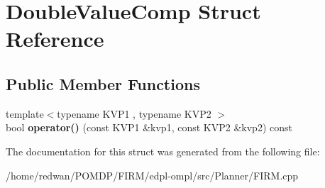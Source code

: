 \hypertarget{struct_double_value_comp}{}\section{Double\+Value\+Comp Struct Reference}
\label{struct_double_value_comp}
\subsection*{Public Member Functions}
\begin{DoxyCompactItemize}
\item 
\mbox{\label{struct_double_value_comp_ad006bf78092cd573750c57d7e6ece43f}} 
{\footnotesize template$<$typename K\+V\+P1 , typename K\+V\+P2 $>$ }\\bool {\bfseries operator()} (const K\+V\+P1 \&kvp1, const K\+V\+P2 \&kvp2) const
\end{DoxyCompactItemize}


The documentation for this struct was generated from the following file\+:\begin{DoxyCompactItemize}
\item 
/home/redwan/\+P\+O\+M\+D\+P/\+F\+I\+R\+M/edpl-\/ompl/src/\+Planner/F\+I\+R\+M.\+cpp\end{DoxyCompactItemize}
